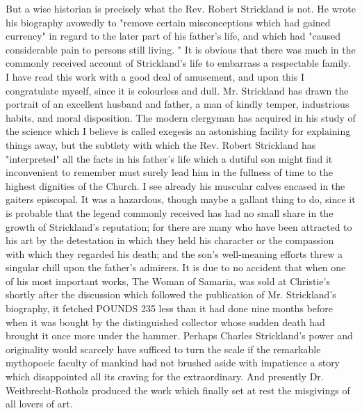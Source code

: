 \documentclass{article}
\begin{document}
  But a wise historian is precisely what the Rev. Robert Strickland is not. He wrote his biography\cite{bib3} avowedly to "remove certain misconceptions which had gained currency" in regard to the later part of his father's life, and which had "caused considerable pain to persons still living. " It is obvious that there was much in the commonly received account of Strickland's life to embarrass a respectable family. I have read this work with a good deal of amusement, and upon this I congratulate myself, since it is colourless and dull. Mr. Strickland has drawn the portrait of an excellent husband and father, a man of kindly temper, industrious habits, and moral disposition. The modern clergyman has acquired in his study of the science which I believe is called exegesis an astonishing facility for explaining things away, but the subtlety with which the Rev. Robert Strickland has "interpreted" all the facts in his father's life which a dutiful son might find it inconvenient to remember must surely lead him in the fullness of time to the highest dignities of the Church. I see already his muscular calves encased in the gaiters episcopal. It was a hazardous, though maybe a gallant thing to do, since it is probable that the legend commonly received has had no small share in the growth of Strickland's reputation; for there are many who have been attracted to his art by the detestation in which they held his character or the compassion with which they regarded his death; and the son's well-meaning efforts threw a singular chill upon the father's admirers. It is due to no accident that when one of his most important works, The Woman of Samaria,\cite{bib4} was sold at Christie's shortly after the discussion which followed the publication of Mr. Strickland's biography, it fetched POUNDS 235 less than it had done nine months before when it was bought by the distinguished collector whose sudden death had brought it once more under the hammer. Perhaps Charles Strickland's power and originality would scarcely have sufficed to turn the scale if the remarkable mythopoeic faculty of mankind had not brushed aside with impatience a story which disappointed all its craving for the extraordinary. And presently Dr. Weitbrecht-Rotholz produced the work which finally set at rest the misgivings of all lovers of art.\par
\end{document}
